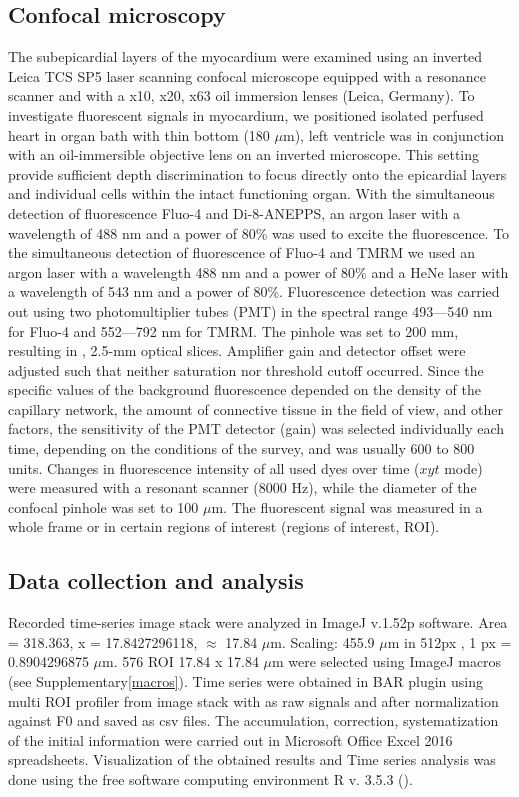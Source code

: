 \documentclass{biophys-new}
\begin{document}
\subsection*{Confocal microscopy}

The subepicardial layers of the myocardium were examined using an inverted Leica TCS SP5 laser scanning confocal microscope equipped with a resonance scanner and with a x10, x20, x63 oil immersion lenses (Leica, Germany).
To investigate fluorescent signals in myocardium, we positioned isolated perfused heart in organ bath with thin bottom (180 $\mu$m), left ventricle was in conjunction with an oil-immersible objective lens on an inverted microscope.
This setting provide sufficient depth discrimination to focus directly onto the epicardial layers and individual cells within the intact functioning organ.
With the simultaneous detection of fluorescence Fluo-4 and Di-8-ANEPPS, an argon laser with a wavelength of 488 nm and a power of 80\% was used to excite the fluorescence.
To the simultaneous detection of fluorescence of Fluo-4 and TMRM we used an argon laser with a wavelength 488 nm and a power of 80\% and a HeNe laser with a wavelength of 543 nm and a power of 80\%.
Fluorescence detection was carried out using two photomultiplier tubes (PMT) in the spectral range 493---540 nm for Fluo-4 and 552---792 nm for TMRM.
The pinhole was set to 200 mm, resulting in , 2.5-mm optical slices. Amplifier gain and detector offset were adjusted such that neither saturation nor threshold cutoff occurred.
Since the specific values of the background fluorescence depended on the density of the capillary network, the amount of connective tissue in the field of view, and other factors, the sensitivity of the PMT detector (gain) was selected individually each time, depending on the conditions of the survey, and was usually 600 to 800 units.
Changes in fluorescence intensity of all used dyes over time ($xyt$ mode) were measured with a resonant scanner (8000 Hz), while the diameter of the confocal pinhole was set to 100 $\mu$m.
The fluorescent signal was measured in a whole frame or in certain regions of interest (regions of interest, ROI).


\subsection*{Data collection and analysis}

Recorded time-series image stack were analyzed in ImageJ v.1.52p software\cite{rueden2017imagej2}.
Area = 318.363, x = 17.8427296118, $\approx$ 17.84 $\mu$m.
Scaling: 455.9 $\mu$m in 512px , 1 px = 0.8904296875 $\mu$m.
576 ROI 17.84 x 17.84 $\mu$m were selected using ImageJ macros (see Supplementary\ref{macros}).
Time series were obtained in BAR plugin using multi ROI profiler from image stack with as raw signals and after normalization against F0 and saved as csv files.
The accumulation, correction, systematization of the initial information were carried out in Microsoft Office Excel 2016 spreadsheets.
Visualization of the obtained results and Time series analysis was done using the free software computing environment R v. 3.5.3 (\cite{team2014r}).
\end{document}
